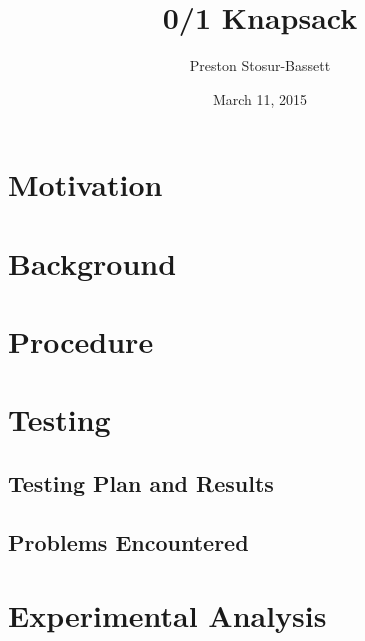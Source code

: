 \documentclass[onecolumn, 12pt, article]{IEEEtran}
\numberwithin{case}{problem}
\numberwithin{condition}{problem}
\numberwithin{condition}{subsection}
\numberwithin{definition}{section}
\theoremstyle{remark}
\numberwithin{question}{problem}
\theoremstyle{plain}
\numberwithin{answer}{problem}
\numberwithin{solution}{section}
\numberwithin{equation}{section}%
\begin{document}
\title{0/1 Knapsack}
\author{Preston Stosur-Bassett}
\date{March 11, 2015}
\maketitle

\pagestyle{fancy}

\begin{abstract}

\end{abstract}

\section{Motivation}


\section{Background}


\section{Procedure}


\section{Testing}
\subsection{Testing Plan and Results}

\subsection{Problems Encountered}


\section{Experimental Analysis}
\end{document}
